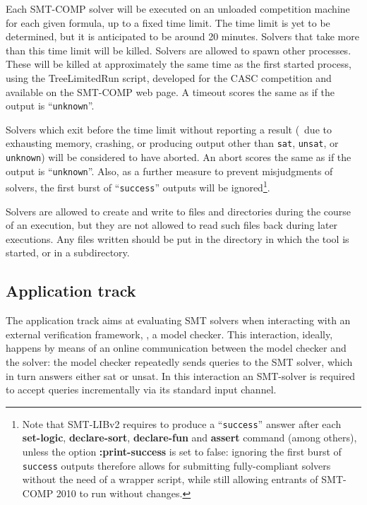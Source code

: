\documentclass[12pt]{article}
\newcommand{\akey}[1]{\textbf{#1}}
\begin{document}
Each SMT-COMP solver will be executed on an
unloaded competition machine for each given formula, up to a fixed
time limit.  The time limit is yet to be determined, but it is
anticipated to be around 20 minutes.  Solvers that take more than this
time limit will be killed.  Solvers are allowed to spawn other
processes.  These will be killed at approximately the same time as the
first started process, using the TreeLimitedRun script, developed for
the CASC competition and available on the SMT-COMP web page.  A
timeout scores the same as if the output is ``\texttt{unknown}''.

Solvers which exit before the time
limit without reporting a result (\ie\ due to exhausting memory, crashing,
or producing output other than \texttt{sat}, \texttt{unsat}, or
\texttt{unknown})
will be considered to have aborted. 
An abort scores the same as if the output is ``\texttt{unknown}''. 
Also, as a further measure to prevent misjudgments of solvers,
the first burst of  ``\texttt{success}'' outputs will be 
ignored\footnote{
Note that SMT-LIBv2 requires to produce a ``\texttt{success}'' answer
after each \akey{set-logic}, \akey{declare-sort}, \akey{declare-fun} and
\akey{assert} command (among others), unless the option
\akey{:print-success} is set to false: ignoring the first burst of
\texttt{success} outputs therefore allows for submitting fully-compliant
solvers without the need of a wrapper script, while still allowing entrants
of SMT-COMP 2010 to run without changes.}.

Solvers are allowed to create and write to
files and directories during the course of an execution, but they are
not allowed to read such files back during later executions.  Any
files written should be put in the directory in which the tool is
started, or in a subdirectory.

\subsection{Application track}
\label{sec:exec:application}

The application track aims at evaluating SMT solvers when interacting
with an external verification framework, \eg, a model
checker. This interaction, ideally, happens by means of an online
communication between the model checker and the solver: the model
checker repeatedly sends queries to the SMT solver, which in turn
answers either sat or unsat.  In this interaction an SMT-solver is
required to accept queries incrementally via its standard input channel.
\end{document}
